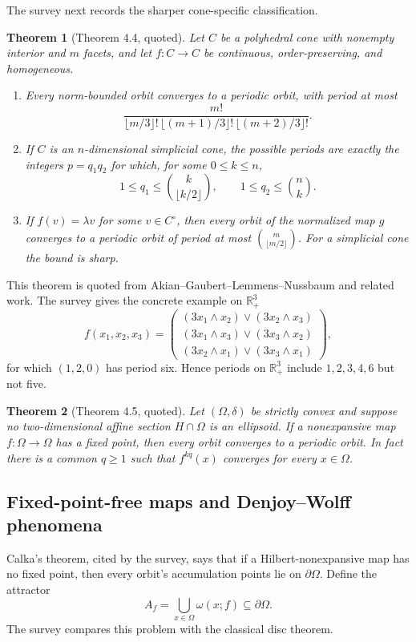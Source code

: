 \documentclass[11pt]{article}
\newtheorem{theorem}{Theorem}
\newcommand{\R}{\mathbb{R}}
\begin{document}
The survey next records the sharper cone-specific classification.
\begin{theorem}[Theorem 4.4, quoted]
Let \(C\) be a polyhedral cone with nonempty interior and \(m\) facets, and let
\(f:C\to C\) be continuous, order-preserving, and homogeneous.
\begin{enumerate}[leftmargin=2em]
\item Every norm-bounded orbit converges to a periodic orbit, with period at most
\[
 \frac{m!}{\lfloor m/3\rfloor!\,\lfloor(m+1)/3\rfloor!\,\lfloor(m+2)/3\rfloor!}.
\]
\item If \(C\) is an \(n\)-dimensional simplicial cone, the possible periods are exactly the
integers \(p=q_1q_2\) for which, for some \(0\le k\le n\),
\[
 1\le q_1\le\binom{k}{\lfloor k/2\rfloor},
 \qquad
 1\le q_2\le\binom{n}{k}.
\]
\item If \(f(v)=\lambda v\) for some \(v\in C^\circ\), then every orbit of the normalized map
\(g\) converges to a periodic orbit of period at most \(\binom{m}{\lfloor m/2\rfloor}\).  For a
simplicial cone the bound is sharp.
\end{enumerate}
\end{theorem}
This theorem is quoted from Akian--Gaubert--Lemmens--Nussbaum and related work.  The survey gives
the concrete example on \(\R_+^3\)
\[
 f(x_1,x_2,x_3)=
 \begin{pmatrix}
 (3x_1\wedge x_2)\vee(3x_2\wedge x_3)\\
 (3x_1\wedge x_3)\vee(3x_3\wedge x_2)\\
 (3x_2\wedge x_1)\vee(3x_3\wedge x_1)
 \end{pmatrix},
\]
for which \((1,2,0)\) has period six.  Hence periods on \(\R_+^3\) include
\(1,2,3,4,6\) but not five.

\begin{theorem}[Theorem 4.5, quoted]
Let \((\Omega,\delta)\) be strictly convex and suppose no two-dimensional affine section
\(H\cap\Omega\) is an ellipsoid.  If a nonexpansive map \(f:\Omega\to\Omega\) has a fixed point,
then every orbit converges to a periodic orbit.  In fact there is a common \(q\ge1\) such that
\(f^{kq}(x)\) converges for every \(x\in\Omega\).
\end{theorem}

\subsection{Fixed-point-free maps and Denjoy--Wolff phenomena}
Calka's theorem, cited by the survey, says that if a Hilbert-nonexpansive map has no fixed point,
then every orbit's accumulation points lie on \(\partial\Omega\).  Define the attractor
\[
 A_f=\bigcup_{x\in\Omega}\omega(x;f)\subseteq\partial\Omega.
\]
The survey compares this problem with the classical disc theorem.
\end{document}
